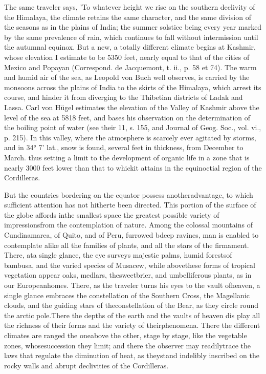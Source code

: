 {The same traveler says, 'To whatever height we rise on the southern declivity of the Himalaya, the climate retains the same character, and the same division of the seasons as in the plains of India; the summer solstice being every year marked by the same prevalence of rain, which continues to fall without intermission until the autumnal equinox. But a new, a totally different climate begins at Kashmir, whose elevation I estimate to be 5350 feet, nearly equal to that of the cities of Mexico and Popayan (Correspond. de Jacquemont, t. ii., p. 58 et 74). The warm and humid air of the sea, as Leopold von Buch well observes, is carried by the monsoons across the plains of India to the skirts of the Himalaya, which arrest its course, and hinder it from diverging to the Thibetian districts of Ladak and Lassa. Carl von Hügel estimates the elevation of the Valley of Kashmir above the level of the sea at 5818 feet, and bases his observation on the determination of the boiling point of water (see their 11, s. 155, and Journal of Geog. Soc., vol. vi., p. 215). In this valley, where the atmosphere is scarcely ever agitated by storms, and in 34° 7' lat., snow is found, several feet in thickness, from December to March.} thus setting a limit to the development of organic life in a zone that is nearly 3000 feet lower than that to whickit attains in the equinoctial region of the Cordilleras.

But the countries bordering on the equator possess anotheradvantage, to which sufficient attention has not hitherte been directed. This portion of the surface of the globe affords inthe smallest space the greatest possible variety of impressionsfrom the contemplation of nature. Among the colossal mountains of Cundinamarea, of Quito, and of Peru, furrowed bdeep ravines, man is enabled to contemplate alike all the families of plants, and all the stars of the firmament. There, ata single glance, the eye surveys majestic palms, humid forestsof bambusa, and the varied species of Musacew, while abovethese forms of tropical vegetation appear oaks, medlars, thesweetbrier, and umbelliferous plants, as in our Europeanhomes. There, as the traveler turns his eyes to the vault ofheaven, a single glance embraces the constellation of the Southern Cross, the Magellanic clouds, and the guiding stars of theconstellation of the Bear, as they circle round the arctic pole.There the depths of the earth and the vaults of heaven dis play all the richness of their forms and the variety of theirphenomena. There the different climates are ranged the oneabove the other, stage by stage, like the vegetable zones, whosesuccession they limit; and there the observer may readilytrace the laws that regulate the diminution of heat, as theystand indelibly inscribed on the rocky walls and abrupt declivities of the Cordilleras.

